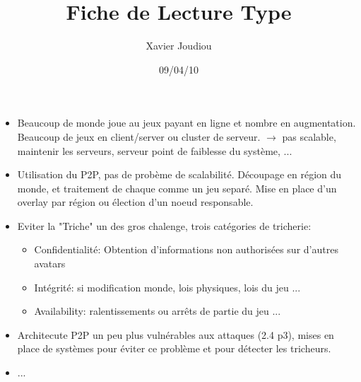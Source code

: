 \documentclass[11pt,a4paper]{article}
\title{Fiche de Lecture Type}
\author{Xavier Joudiou}
\date{09/04/10}
\begin{document}
	
  \begin{itemize}
  \renewcommand{\labelitemi}{$\Rightarrow$}
	\item Beaucoup de monde joue au jeux payant en ligne et nombre en augmentation. Beaucoup de jeux en client/server ou cluster de serveur.
		$\rightarrow$ pas scalable, maintenir les serveurs, serveur point de faiblesse du système, ...
	\item Utilisation du P2P, pas de probème de scalabilité. Découpage en région du monde, et traitement de chaque comme un jeu separé. Mise en place d'un overlay par région ou élection d'un noeud responsable.
	\item Eviter la "Triche" un des gros chalenge, trois catégories de tricherie:
		\begin{itemize}
			\item Confidentialité: Obtention d'informations non authorisées sur d'autres avatars
			\item Intégrité: si modification monde, lois physiques, lois du jeu ...
			\item Availability: ralentissements ou arrêts de partie du jeu ...
		\end{itemize}
	\item Architecute P2P un peu plus vulnérables aux attaques (2.4 p3), mises en place de systèmes pour éviter ce problème et pour détecter les tricheurs.
	\item ...
  \end{itemize}
\end{document}
